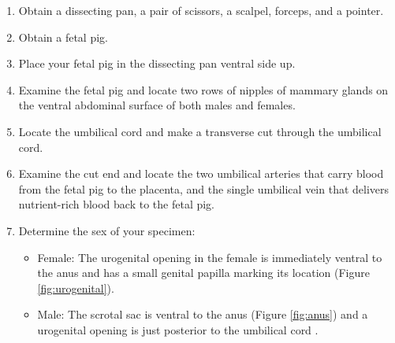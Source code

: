 \begin{enumerate}
\def\labelenumi{\arabic{enumi}.}
\tightlist
\item
  Obtain a dissecting pan, a pair of scissors, a scalpel, forceps, and a pointer.
\item
  Obtain a fetal pig.
\item
  Place your fetal pig in the dissecting pan ventral side up.
\item
  Examine the fetal pig and locate two rows of nipples of mammary glands on the ventral abdominal
  surface of both males and females.
\item
  Locate the umbilical cord and make a transverse cut through the umbilical cord.
\item
  Examine the cut end and locate the two umbilical arteries that carry blood from the fetal pig to the placenta, and the single umbilical vein that delivers nutrient-rich blood back to the fetal pig.
\item
  Determine the sex of your specimen:

  \begin{itemize}
  \tightlist
  \item
    Female: The urogenital opening in the female is immediately ventral to the anus and has a small genital papilla marking its location (Figure \ref{fig:urogenital}).
  \item
    Male: The scrotal sac is ventral to the anus (Figure \ref{fig:anus}) and a urogenital opening is just posterior to the umbilical cord .
  \end{itemize}


\end{enumerate}
